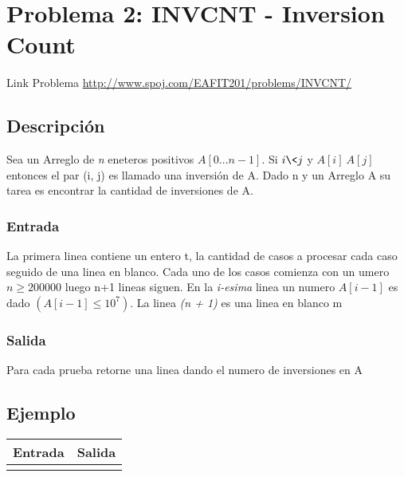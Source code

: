 \section{Problema 2: INVCNT - Inversion Count}

Link Problema \url{http://www.spoj.com/EAFIT201/problems/INVCNT/}

\subsection{Descripción}

Sea un Arreglo de \emph{n} eneteros positivos $A[0...n-1]$. Si $ i \< j$ y $ A[i] \> A[j]$ entonces el par (i, j) es llamado una inversión de A.
Dado n y un Arreglo A su tarea es encontrar la cantidad de inversiones de A.

\subsubsection{Entrada}
La primera linea contiene un entero t, la cantidad de casos a procesar cada caso seguido de una linea en blanco.
Cada uno de los casos comienza con un umero $ n \geq 200000 $ luego n+1 lineas siguen.
En la \emph{i-esima} linea un numero $A[i - 1]$ es dado $(A[i - 1] \leq 10^7).$ La linea \emph{(n + 1)} es una linea en blanco
m

\subsubsection{Salida}

Para cada prueba retorne una linea dando el numero de inversiones en A

\subsection{Ejemplo}

\begin{tabu} to \linewidth {|X[c]|X[c]|}
  \hline
  \rowfont{\bfseries\itshape\large} Entrada & Salida \\
  \hline
   &  \\
  \hline  
\end{tabu}
